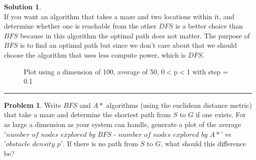 \documentclass{article}
\theoremstyle{definition}
\newtheorem{problem}{Problem}
\def\fline{\rule{0.75\linewidth}{0.5pt}}
\newcommand{\finishline}{\vspace{-15pt}\begin{center}\fline\end{center}}
\newtheorem*{solution*}{Solution}
\newenvironment{solution}{\begin{solution*}}{{\finishline} \end{solution*}}
\begin{document}
\begin{solution} \hfill \\
	If you want an algorithm that takes a maze and two locations within it, and determine whether one is reachable from the other $DFS$ is a better choice than $BFS$ because in this algorithm the optimal path does not matter. The purpose of $BFS$ is to find an optimal path but since we don't care about that we should choose the algorithm that uses less compute power, which is $DFS$.
	
	\begin{figure}[h]
	\centering
	\caption{Plot using a dimension of 100, average of 50, 0$<$p$<$1 with step = 0.1}
	\end{figure}
	
\end{solution}


\smallskip


\begin{problem}
	Write $BFS$ and $A*$ algorithms (using the euclidean distance metric) that take a maze and determine the shortest path from $S$ to $G$ if one exists. For as large a dimension as your system can handle, generate a plot of the average $'number$ $of$ $nodes$ $explored$ $by$ $BFS$ - $number$ $of$ $nodes$ $explored$ $by$ $A*$' vs $'obstacle$ $density$ $p'$. If there is no path from $S$ to $G$, what should this difference be? 
	
\end{problem}

\smallskip
\end{document}
